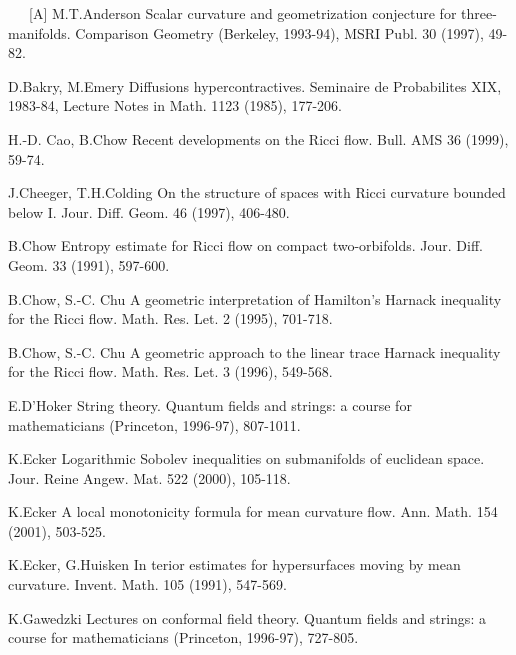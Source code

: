\documentclass[12pt]{article}
\theoremstyle{plain}
{\swapnumbers
\newtheorem{thm}{Theorem}[section]
\newtheorem{cor}[thm]{Corollary}
\newtheorem{lem}[thm]{Lemma}
\newtheorem{prop}[thm]{Proposition}
}
\theoremstyle{definition}
{\swapnumbers
\newtheorem{defn}[thm]{Definition}
\newtheorem{nota}[thm]{Notation}
\newtheorem{parag}[thm]{}
\newtheorem*{parstr}{\addtocounter{thm}{1}\thesection.\arabic{thm}*}
\newtheorem*{intropar}{\addtocounter{thm}{1}\arabic{thm}}
}
\theoremstyle{remark} {\swapnumbers
\newtheorem{rem}[thm]{Remark}
\newtheorem{exam}[thm]{Example}
\newtheorem{lemma}[thm]{Lemma}
\newtheorem{claim}[thm]{Claim}
}
\numberwithin{equation}{section}
\begin{document}
            \ \ \  [A] M.T.Anderson Scalar curvature and geometrization
            conjecture for three-manifolds.  Comparison Geometry
            (Berkeley, 1993-94), MSRI Publ. 30 (1997), 49-82.
            \par
             [B-Em] D.Bakry, M.Emery Diffusions hypercontractives.
             Seminaire de Probabilites XIX, 1983-84, Lecture Notes
             in Math. 1123 (1985), 177-206. \par
              [Cao-C] H.-D. Cao, B.Chow Recent developments on the
              Ricci flow. Bull. AMS 36 (1999), 59-74. \par
               [Ch-Co] J.Cheeger, T.H.Colding On the structure of
               spaces with Ricci curvature bounded below I. Jour.
                Diff. Geom. 46 (1997), 406-480. \par
                [C] B.Chow Entropy estimate for Ricci flow on
                compact two-orbifolds. Jour. Diff. Geom. 33
                (1991), 597-600. \par
               [C-Chu 1] B.Chow, S.-C. Chu A geometric
               interpretation of Hamilton's Harnack inequality for
               the Ricci flow. Math. Res. Let. 2 (1995), 701-718.
               \par [C-Chu 2] B.Chow, S.-C. Chu A geometric
               approach to the linear trace Harnack inequality for
               the Ricci flow. Math. Res. Let. 3 (1996), 549-568.
               \par [D] E.D'Hoker String theory. Quantum fields
               and strings: a course for mathematicians
               (Princeton, 1996-97), 807-1011. \par
               \par [E 1] K.Ecker Logarithmic Sobolev inequalities
               on submanifolds of euclidean space. Jour. Reine
               Angew. Mat. 522 (2000), 105-118. \par
               [E 2] K.Ecker A local monotonicity formula for mean
               curvature flow. Ann. Math. 154 (2001), 503-525.
               \par [E-Hu] K.Ecker, G.Huisken In terior estimates
               for hypersurfaces moving by mean curvature. Invent.
               Math. 105 (1991), 547-569. \par
               [Gaw] K.Gawedzki Lectures on conformal field
               theory. Quantum fields and strings: a course for
               mathematicians (Princeton, 1996-97), 727-805. \par
\end{document}

